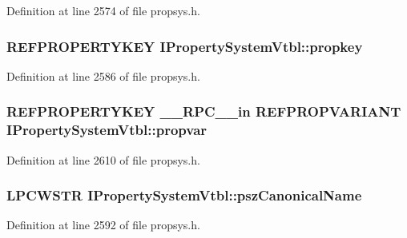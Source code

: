 Definition at line 2574 of file propsys.\+h.

\subsubsection[{\texorpdfstring{propkey}{propkey}}]{ {\bf R\+E\+F\+P\+R\+O\+P\+E\+R\+T\+Y\+K\+EY} I\+Property\+System\+Vtbl\+::propkey}\hypertarget{struct_i_property_system_vtbl_afd840bd8c70ba0e40293ce2c045cb389}{}\label{struct_i_property_system_vtbl_afd840bd8c70ba0e40293ce2c045cb389}


Definition at line 2586 of file propsys.\+h.

\subsubsection[{\texorpdfstring{propvar}{propvar}}]{ {\bf R\+E\+F\+P\+R\+O\+P\+E\+R\+T\+Y\+K\+EY} {\bf \+\_\+\+\_\+\+R\+P\+C\+\_\+\+\_\+in} {\bf R\+E\+F\+P\+R\+O\+P\+V\+A\+R\+I\+A\+NT} I\+Property\+System\+Vtbl\+::propvar}\hypertarget{struct_i_property_system_vtbl_abee13af1ee9cc03b4cf60ff41afb1f32}{}\label{struct_i_property_system_vtbl_abee13af1ee9cc03b4cf60ff41afb1f32}


Definition at line 2610 of file propsys.\+h.

\subsubsection[{\texorpdfstring{psz\+Canonical\+Name}{pszCanonicalName}}]{ {\bf L\+P\+C\+W\+S\+TR} I\+Property\+System\+Vtbl\+::psz\+Canonical\+Name}\hypertarget{struct_i_property_system_vtbl_a1e2dda416f6cfff07a88f7bb5e9b48d5}{}\label{struct_i_property_system_vtbl_a1e2dda416f6cfff07a88f7bb5e9b48d5}


Definition at line 2592 of file propsys.\+h.

